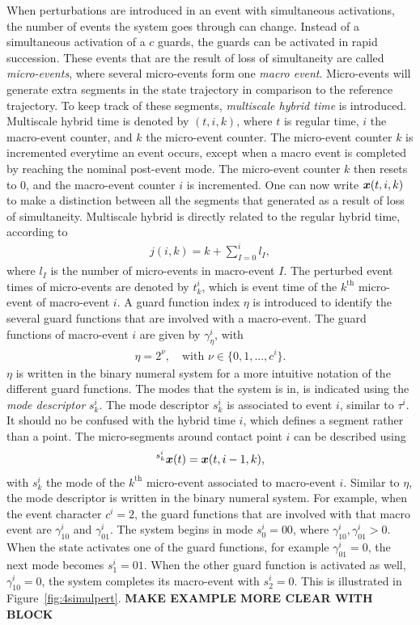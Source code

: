 \documentclass[../DC2017114Bouma.tex]{subfiles}
\begin{document}
When perturbations are introduced in an event with simultaneous activations, the number of events the system goes through can change. Instead of a simultaneous activation of a $c$ guards, the guards can be activated in rapid succession. These events that are the result of loss of simultaneity are called \textit{micro-events}, where several micro-events form one \textit{macro event}. Micro-events will generate extra segments in the state trajectory in comparison to the reference trajectory. To keep track of these segments, \textit{multiscale hybrid time} is introduced. Multiscale hybrid time is denoted by $(t,i,k)$, where $t$ is regular time, $i$ the macro-event counter, and $k$ the micro-event counter. The micro-event counter $k$ is incremented everytime an event occurs, except when a macro event is completed by reaching the nominal post-event mode. The micro-event counter $k$ then resets to $0$, and the macro-event counter $i$ is incremented. One can now write ${\boldsymbol{x}}(t,i,k)$ to make a distinction between all the segments that generated as a result of loss of simultaneity. Multiscale hybrid is directly related to the regular hybrid time, according to
\begin{align}
j(i,k) = k + \sum_{I=0}^{i}l_I,
\end{align}
where $l_I$ is the number of micro-events in macro-event $I$. The perturbed event times of micro-events are denoted by $t_k^i$, which is event time of the $k^{\text{th}}$ micro-event of macro-event $i$. A guard function index $\eta$ is introduced to identify the several guard functions that are involved with a macro-event. The guard functions of macro-event $i$ are given by $\gamma_{\eta}^i$, with
\begin{align}
\eta = 2^{\nu},\quad\text{with }\nu\in\{0,1,...,c^i\}.
\end{align}
$\eta$ is written in the binary numeral system for a more intuitive notation of the different guard functions. The modes that the system is in, is indicated using the \textit{mode descriptor} $s_k^i$. The mode descriptor $s_k^i$ is associated to event $i$, similar to $\tau^i$. It should no be confused with the hybrid time $i$, which defines a segment rather than a point. The micro-segments around contact point $i$ can be described using
\begin{align}
\hspace{0cm}^{s_k^i}{\boldsymbol{x}}(t) = {\boldsymbol{x}}(t,i-1,k),
\end{align}
with $s_k^i$ the mode of the $k^{\text{th}}$ micro-event associated to macro-event $i$. Similar to $\eta$, the mode descriptor is written in the binary numeral system. For example, when the event character $c^i = 2$, the guard functions that are involved with that macro event are $\gamma^i_{10}$ and $\gamma^i_{01}$. The system begins in mode $s^i_0 = 00$, where $\gamma^i_{10},\gamma^i_{01}>0$. When the state activates one of the guard functions, for example $\gamma^i_{01}=0$, the next mode becomes $s^i_1 = 01$. When the other guard function is activated as well, $\gamma^i_{10} = 0$, the system completes its macro-event with $s^i_2 = 0$. This is illustrated in Figure~\ref{fig:4simulpert}. \textbf{MAKE EXAMPLE MORE CLEAR WITH BLOCK}
\end{document}
